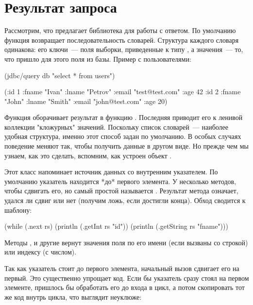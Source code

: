 \section{Результат запроса}

Рассмотрим, что предлагает библиотека для работы с ответом. По умолчанию функция  возвращает последовательность словарей. Структура каждого словаря одинакова: его ключи~--- поля выборки, приведенные к типу , а значения~--- то, что пришло для этого поля из базы. Пример с пользователями:

\begin{english}
  \begin{clojure}
(jdbc/query db "select * from users")

({:id 1
  :fname "Ivan"
  :lname "Petrov"
  :email "test@test.com"
  :age 42}
 {:id 2
  :fname "John"
  :lname "Smith"
  :email "john@test.com"
  :age 20})
  \end{clojure}
\end{english}

Функция  оборачивает результат  в функцию . Последняя приводит его к ленивой коллекции "кложурных" значений. Поскольку список словарей~--- наиболее удобная структура, именно этот способ задан по умолчанию. В особых случаях поведение  меняют так, чтобы получить данные в другом виде. Но прежде чем мы узнаем, как это сделать, вспомним, как устроен объект .

Этот класс напоминает источник данных со внутренним указателем. По умолчанию указатель находится *до* первого элемента. У  несколько методов, чтобы сдвигать его, но самый простой называется . Результат метода означает, удался ли сдвиг или нет (получим ложь, если достигли конца). Обход  сводится к шаблону:

\begin{english}
  \begin{clojure}
(while (.next rs)
  (println (.getInt rs "id"))
  (println (.getString rs "fname")))
  \end{clojure}
\end{english}

Методы ,  и другие вернут значения поля по его имени (если вызваны со строкой) или индексу (с числом).

Так как указатель стоит до первого элемента, начальный вызов  сдвигает его на первый. Это существенно упрощает код. Если бы указатель сразу стоял на первом элементе, пришлось бы обработать его до входа в цикл, а потом скопировать тот же код внутрь цикла, что выглядит неуклюже:

